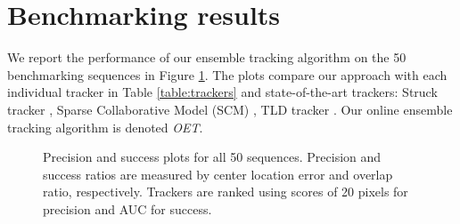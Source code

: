 \section{Benchmarking results}

We report the performance of our ensemble tracking algorithm on the 50
benchmarking sequences in
Figure \ref{fig:results}.
The plots compare our approach with each individual tracker
in Table \ref{table:trackers} and state-of-the-art trackers: Struck tracker
\cite{Hare2011}, Sparse Collaborative Model (SCM) \cite{Zhong2012}, TLD tracker
\cite{Kalal2011}. Our online ensemble tracking algorithm is denoted \textit{OET}.

\begin{figure}[h!]
\centering
{}
\caption[Precision and success plots for all 50 sequences]{\small  Precision and success plots for all 50 sequences. Precision and success
		ratios are measured by center location error and overlap ratio,
		respectively. Trackers are ranked using scores of 20 pixels for
		precision and AUC for success.}
\label{fig:results}
\end{figure}

